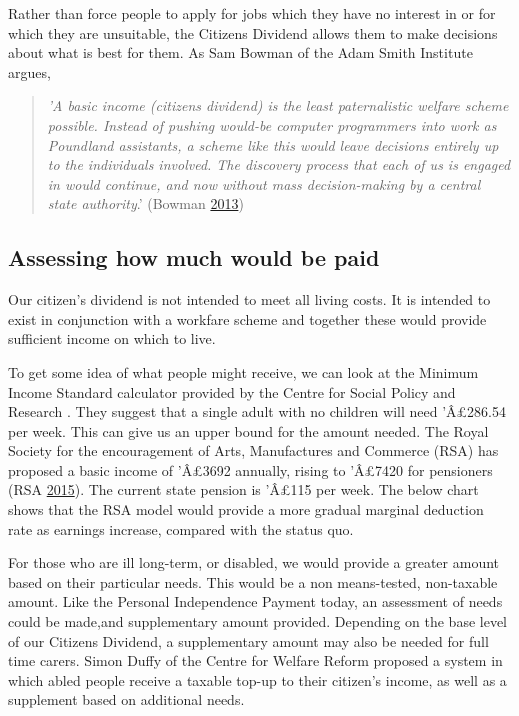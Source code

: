 \documentclass[]{tufte-handout}
\begin{document}
Rather than force people to apply for jobs which they have no interest
in or for which they are unsuitable, the Citizens Dividend allows them
to make decisions about what is best for them. As Sam Bowman of the Adam
Smith Institute argues,

\begin{quote}
\emph{'A basic income (citizens dividend) is the least paternalistic
welfare scheme possible. Instead of pushing would-be computer
programmers into work as Poundland assistants, a scheme like this would
leave decisions entirely up to the individuals involved. The discovery
process that each of us is engaged in would continue, and now without
mass decision-making by a central state authority}.' (Bowman
\protect\hyperlink{ref-SamBowman2013}{2013})
\end{quote}

\hypertarget{assessing-how-much-would-be-paid}{%
\subsection{Assessing how much would be
paid}\label{assessing-how-much-would-be-paid}}

Our citizen's dividend is not intended to meet all living costs. It is
intended to exist in conjunction with a workfare scheme and together
these would provide sufficient income on which to live.

To get some idea of what people might receive, we can look at the
Minimum Income Standard calculator provided by the Centre for Social
Policy and Research . They suggest that a single adult with no children
will need 'Â£286.54 per week. This can give us an upper bound for the
amount needed. The Royal Society for the encouragement of Arts,
Manufactures and Commerce (RSA) has proposed a basic income of 'Â£3692
annually, rising to 'Â£7420 for pensioners (RSA
\protect\hyperlink{ref-RSA2015}{2015}). The current state pension is
'Â£115 per week. The below chart shows that the RSA model would provide
a more gradual marginal deduction rate as earnings increase, compared
with the status quo.

For those who are ill long-term, or disabled, we would provide a greater
amount based on their particular needs. This would be a non
means-tested, non-taxable amount. Like the Personal Independence Payment
today, an assessment of needs could be made,and supplementary amount
provided. Depending on the base level of our Citizens Dividend, a
supplementary amount may also be needed for full time carers. Simon
Duffy of the Centre for Welfare Reform proposed a system in which abled
people receive a taxable top-up to their citizen's income, as well as a
supplement based on additional needs.
\end{document}
